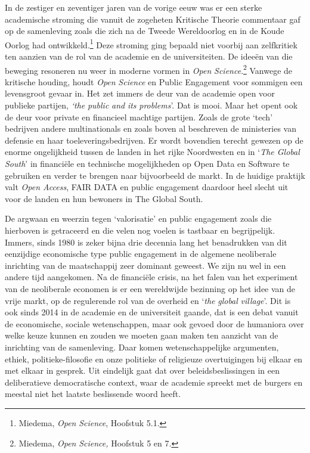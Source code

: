 \documentclass[smallauthor, chapterhaspagenum, nochapterinheader, pagenuminheader,  bigchapnum,medium2, tocpages, garamond, titleinheader]{jote-book}
\begin{document}
	In de zestiger en zeventiger jaren van de vorige eeuw was er een sterke academische stroming die vanuit de zogeheten Kritische Theorie commentaar gaf op de samenleving zoals die zich na de Tweede Wereldoorlog en in de Koude Oorlog had ontwikkeld.\footnote{Miedema, \emph{Open }\emph{Science}, Hoofstuk 5.1.} Deze stroming ging bepaald niet voorbij aan zelfkritiek ten aanzien van de rol van de academie en de universiteiten. De ideeën van die beweging resoneren nu weer in moderne vormen in \emph{Open }\emph{Science}.\footnote{Miedema, \emph{Open }\emph{Science}\emph{, }Hoofstuk 5 en 7.} Vanwege de kritische houding, houdt \emph{Open }\emph{Science} en Public Engagement voor sommigen een levensgroot gevaar in. Het zet immers de deur van de academie open voor publieke partijen, \emph{‘}\emph{the}\emph{ public }\emph{and}\emph{ }\emph{its}\emph{ }\emph{problems}'. Dat is mooi. Maar het opent ook de deur voor private en financieel machtige partijen. Zoals de grote ‘tech' bedrijven andere multinationals en zoals boven al beschreven de ministeries van defensie en haar toeleveringsbedrijven. Er wordt bovendien terecht gewezen op de enorme ongelijkheid tussen de landen in het rijke Noordwesten en in ‘\emph{The Global South}' in financiële en technische mogelijkheden op Open Data en Software te gebruiken en verder te brengen naar bijvoorbeeld de markt. In de huidige praktijk valt \emph{Open Access}, FAIR DATA en public engagement daardoor heel slecht uit voor de landen en hun bewoners in The Global South.



	De argwaan en weerzin tegen ‘valorisatie' en public engagement zoals die hierboven is getraceerd en die velen nog voelen is tastbaar en begrijpelijk. Immers, sinds 1980 is zeker bijna drie decennia lang het benadrukken van dit eenzijdige economische type public engagement in de algemene neoliberale inrichting van de maatschappij zeer dominant geweest. We zijn nu wel in een andere tijd aangekomen. Na de financiële crisis, na het falen van het experiment van de neoliberale economen is er een wereldwijde bezinning op het idee van de vrije markt, op de regulerende rol van de overheid en ‘\emph{the}\emph{ }\emph{global}\emph{ }\emph{village}'. Dit is ook sinds 2014 in de academie en de universiteit gaande, dat is een debat vanuit de economische, sociale wetenschappen, maar ook gevoed door de humaniora over welke keuze kunnen en zouden we moeten gaan maken ten aanzicht van de inrichting van de samenleving. Daar komen wetenschappelijke argumenten, ethiek, politieke-filosofie en onze politieke of religieuze overtuigingen bij elkaar en met elkaar in gesprek. Uit eindelijk gaat dat over beleidsbeslissingen in een deliberatieve democratische context, waar de academie spreekt met de burgers en meestal niet het laatste beslissende woord heeft.
\end{document}
